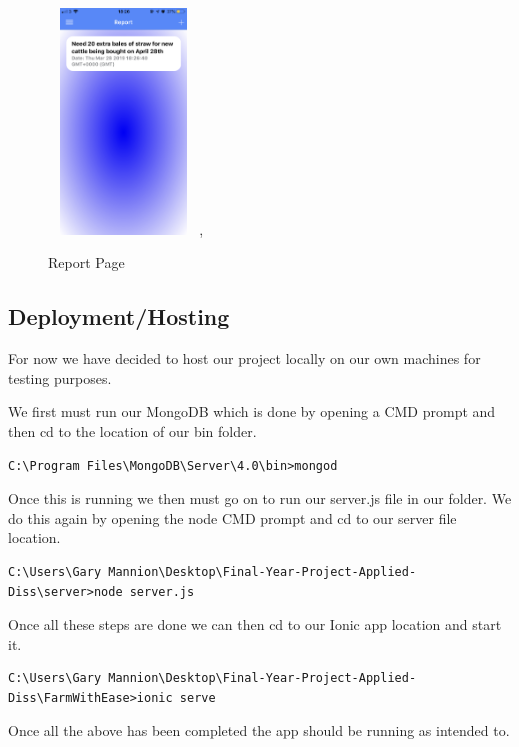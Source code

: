 \documentclass[12pt,a4paper,oneside,openany]{book}
\begin{document}
\begin{figure}[ht]
\renewcommand\thefigure{5.19}
\centering
\includegraphics[width=4cm,height=6cm]{Images/reportPage.png},
\caption{Report Page}
\label{report}
\end{figure}

\newpage
\subsection{Deployment/Hosting}
For now we have decided to host our project locally on our own machines for testing purposes.

We first must run our MongoDB which is done by opening a CMD prompt and then cd to the location of our bin folder.
\begin{verbatim}
C:\Program Files\MongoDB\Server\4.0\bin>mongod
\end{verbatim}

Once this is running we then must go on to run our server.js file in our folder. We do this again by opening the node CMD prompt and cd to our server file location.
\begin{verbatim}
C:\Users\Gary Mannion\Desktop\Final-Year-Project-Applied-Diss\server>node server.js
\end{verbatim}

Once all these steps are done we can then cd to our Ionic app location and start it.
\begin{verbatim}
C:\Users\Gary Mannion\Desktop\Final-Year-Project-Applied-Diss\FarmWithEase>ionic serve
\end{verbatim}

Once all the above has been completed the app should be running as intended to.
\end{document}
